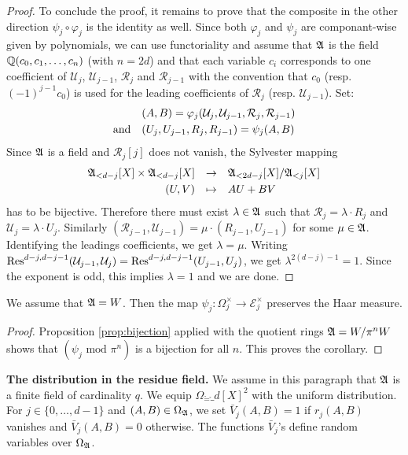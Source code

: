 \documentclass{sig-alternate}
\begin{document}
\begin{proof}
To conclude the proof, it remains to prove that the composite in 
the other direction $\psi_j \circ \varphi_j$ is the identity as well. 
Since both $\varphi_j$ and $\psi_j$ are componant-wise given by 
polynomials, we can use functoriality and assume that $\mathfrak A$ is 
the field $\mathbb Q(c_0, c_1, \ldots, c_n)$ (with $n = 2d$) and that 
each variable $c_i$ corresponds to one coefficient of $\mathcal U_j$, 
$\mathcal U_{j-1}$, $\mathcal R_j$ and $\mathcal R_{j-1}$ with the
convention that $c_0$ (resp. $(-1)^{j-1} c_0$) is used for the leading
coefficients of $\mathcal R_j$ (resp. $\mathcal U_{j-1}$). Set:
$$\begin{array}{ll}
& (A,B) = \varphi_j(\mathcal U_j, \mathcal U_{j-1}, 
\mathcal R_j, \mathcal R_{j-1}) \smallskip \\
\text{and} & (U_j, U_{j-1}, R_j, R_{j-1}) = \psi_j(A,B)
\end{array}$$
Since $\mathfrak A$ is a field and $\mathcal R_j[j]$ does not vanish, the 
Sylvester mapping
$$\begin{array}{rcl}
\ring_{<d-j}[X] \times \ring_{<d-j}[X] & \to & 
\ring_{<2d-j}[X]/\ring_{<j}[X] \smallskip \\
(U,V) & \mapsto & AU + BV
\end{array}$$
has to be bijective. Therefore there must exist $\lambda \in \mathfrak A$ 
such that $\mathcal R_j = \lambda \cdot R_j$ and $\mathcal U_j = \lambda 
\cdot U_j$. Similarly $(\mathcal R_{j-1}, \mathcal U_{j-1}) = \mu \cdot
(R_{j-1}, U_{j-1})$ for some $\mu \in \mathfrak A$. Identifying the leadings 
coefficients, we get $\lambda = \mu$. Writing
$\text{\rm Res}^{d-j,d-j-1}(\mathcal U_{j-1}, \mathcal U_j) = 
\text{\rm Res}^{d-j,d-j-1}(U_{j-1}, U_j)$,
we get $\lambda^{2(d-j)-1} = 1$. Since the exponent is odd, this implies 
$\lambda = 1$ and we are done.
\end{proof}

\begin{cor}
\label{cor:bijection}
We assume that $\mathfrak A = W$. Then the map $\psi_j : \Omega_j^\times
\to \mathcal E_j^\times$ preserves the Haar measure.
\end{cor}

\begin{proof}
Proposition \ref{prop:bijection} applied with the quotient rings $\mathfrak A 
= W/\pi^nW$ shows that $(\psi_j \text{ mod } \pi^n)$ is a bijection 
for all $n$. This proves the corollary.
\end{proof}

\noindent 
\textbf{The distribution in the residue field.}
We assume in this paragraph that $\mathfrak A$ is a finite field of 
cardinality $q$. We equip $\Omega_\ring = \ring_d[X]^2$ with the uniform 
distribution. For $j \in \{0, \ldots, d-1\}$ and $(A,B) \in \Omega_\mathfrak A$,
we set $\bar V_j(A,B) = 1$ if $r_j(A,B)$ vanishes and $\bar V_j(A,B) = 0$
otherwise. The functions $\bar V_j$'s define random variables over 
$\Omega_\mathfrak A$.
\end{document}
